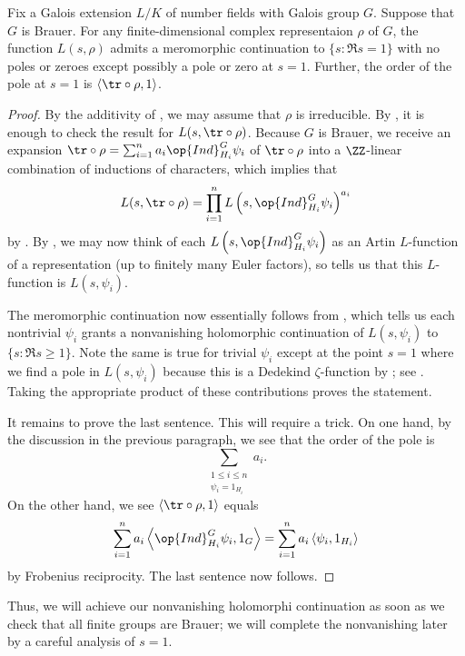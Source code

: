 \documentclass[../thesis.tex]{subfiles}
\begin{document}
\begin{lemma} \label{lem:brauer-to-artin}
	Fix a Galois extension $L/K$ of number fields with Galois group $G$. Suppose that $G$ is Brauer. For any finite-dimensional complex representaion $\rho$ of $G$, the function $L(s,\rho)$ admits a meromorphic continuation to $\{s:\Re s=1\}$ with no poles or zeroes except possibly a pole or zero at $s=1$. Further, the order of the pole at $s=1$ is $\langle{\tr}\circ\rho,1\rangle$.
\end{lemma}
\begin{proof}
	By the additivity of , we may assume that $\rho$ is irreducible. By , it is enough to check the result for $L(s,{\tr}\circ\rho)$. Because $G$ is Brauer, we receive an expansion ${\tr}\circ\rho=\sum_{i=1}^na_i\op{Ind}_{H_i}^G\psi_i$ of ${\tr}\circ\rho$ into a $\ZZ$-linear combination of inductions of characters, which implies that
	\[L(s,{\tr}\circ\rho)=\prod_{i=1}^nL\left(s,\op{Ind}_{H_i}^G\psi_i\right)^{a_i}\]
	by . By , we may now think of each $L\left(s,\op{Ind}_{H_i}^G\psi_i\right)$ as an Artin $L$-function of a representation (up to finitely many Euler factors), so  tells us that this $L$-function is $L(s,\psi_i)$.
	
	The meromorphic continuation now essentially follows from , which tells us each nontrivial $\psi_i$ grants a nonvanishing holomorphic continuation of $L(s,\psi_i)$ to $\{s:\Re s\ge1\}$. Note the same is true for trivial $\psi_i$ except at the point $s=1$ where we find a pole in $L(s,\psi_i)$ because this is a Dedekind $\zeta$-function by ; see . Taking the appropriate product of these contributions proves the statement.

	It remains to prove the last sentence. This will require a trick. On one hand, by the discussion in the previous paragraph, we see that the order of the pole is
	\[\sum_{\substack{1\le i\le n\\\psi_i=1_{H_i}}}a_i.\]
	On the other hand, we see $\langle{\tr}\circ\rho,1\rangle$ equals
	\[\sum_{i=1}^na_i\left\langle\op{Ind}_{H_i}^G\psi_i,1_G\right\rangle=\sum_{i=1}^na_i\left\langle\psi_i,1_{H_i}\right\rangle\]
	by Frobenius reciprocity. The last sentence now follows.
\end{proof}
Thus, we will achieve our nonvanishing holomorphi continuation as soon as we check that all finite groups are Brauer; we will complete the nonvanishing later by a careful analysis of $s=1$.
\end{document}
